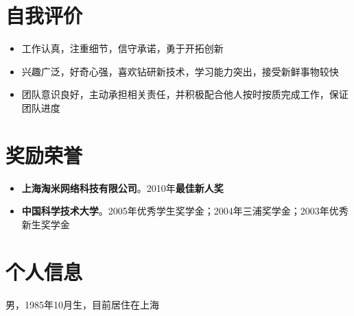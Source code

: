 \documentclass[margin]{res}
\newcommand{\ustc}{中国科学技术大学}
\newcommand{\taomee}{上海淘米网络科技有限公司}
\begin{document}
\section{\Large 自我评价}
\begin{itemize}
    \item 工作认真，注重细节，信守承诺，勇于开拓创新
    \item 兴趣广泛，好奇心强，喜欢钻研新技术，学习能力突出，接受新鲜事物较快
    \item 团队意识良好，主动承担相关责任，并积极配合他人按时按质完成工作，保证团队进度 
\end{itemize}


\section{\Large 奖励荣誉} 
\begin{itemize}
    \item {\bf \taomee}。2010年{\bf 最佳新人奖}
    \item {\bf \ustc}。2005年优秀学生奖学金；2004年三浦奖学金；2003年优秀新生奖学金
\end{itemize}

\section{\Large 个人信息}
    男，1985年10月生，目前居住在上海
\end{document}
